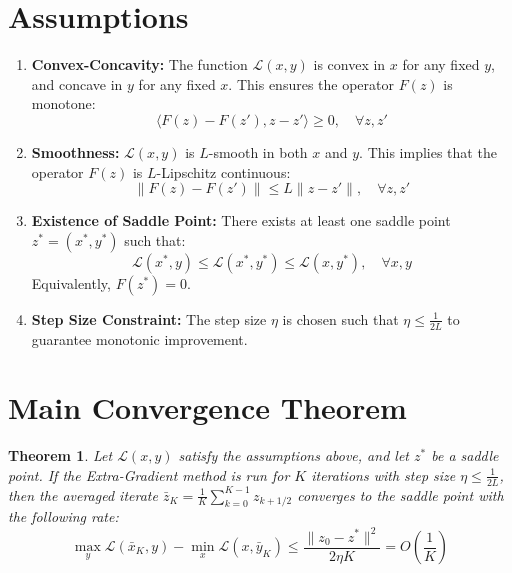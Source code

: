 \documentclass{article}
\newtheorem{theorem}{Theorem}
\begin{document}
\section*{Assumptions}
\begin{enumerate}
\item \textbf{Convex-Concavity:} The function $\mathcal{L}(x, y)$ is convex in $x$ for any fixed $y$, and concave in $y$ for any fixed $x$. This ensures the operator $F(z)$ is monotone:
$$ \langle F(z) - F(z'), z - z' \rangle \geq 0, \quad \forall z, z' $$
\item \textbf{Smoothness:} $\mathcal{L}(x, y)$ is $L$-smooth in both $x$ and $y$. This implies that the operator $F(z)$ is $L$-Lipschitz continuous:
$$ \|F(z) - F(z')\| \leq L \|z - z'\|, \quad \forall z, z' $$
\item \textbf{Existence of Saddle Point:} There exists at least one saddle point $z^* = (x^*, y^*)$ such that:
$$ \mathcal{L}(x^*, y) \leq \mathcal{L}(x^*, y^*) \leq \mathcal{L}(x, y^*), \quad \forall x, y $$
Equivalently, $F(z^*) = 0$.
\item \textbf{Step Size Constraint:} The step size $\eta$ is chosen such that $\eta \leq \frac{1}{2L}$ to guarantee monotonic improvement.
\end{enumerate}

\section*{Main Convergence Theorem}
\begin{theorem}
Let $\mathcal{L}(x,y)$ satisfy the assumptions above, and let $z^*$ be a saddle point. If the Extra-Gradient method is run for $K$ iterations with step size $\eta \leq \frac{1}{2L}$, then the averaged iterate $\bar{z}_K = \frac{1}{K} \sum_{k=0}^{K-1} z_{k+1/2}$ converges to the saddle point with the following rate:
$$ \max_{y} \mathcal{L}(\bar{x}_K, y) - \min_{x} \mathcal{L}(x, \bar{y}_K) \leq \frac{\|z_0 - z^*\|^2}{2 \eta K} = O\left(\frac{1}{K}\right) $$
\end{theorem}
\end{document}
